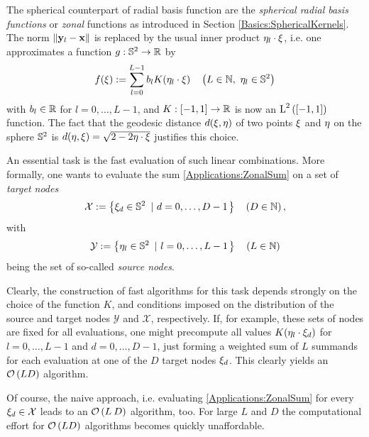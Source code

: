 The spherical counterpart of radial basis function are the \emph{spherical radial basis functions} 
or \emph{zonal} functions as introduced in Section 
\ref{Basics:SphericalKernels}. The norm $\left\|\mathbf{y}_{l}-\mathbf{x}\right\|$ is replaced 
by the usual inner product $\mathbf{\eta}_{l}\cdot\mathbf{\xi}$, i.e. one
approximates a function $g: \mathbb{S}^2 \rightarrow \mathbb{R}$ by
\begin{equation}
  \label{Applications:ZonalSum}
  f{\hspace{-0.4ex}}\left(\mathbf{\xi}\right) := \sum_{l=0}^{L-1} b_{l} K{\hspace{-0.4ex}}\left(\mathbf{\eta}_{l}\cdot\mathbf{\xi}\right) \quad 
  \left(L \in \mathbb{N},\ \mathbf{\eta}_{l} \in \mathbb{S}^2\right)
\end{equation}
with $b_{l} \in \mathbb{R}$ for $l=0,\ldots,L-1$, and 
$K: [-1,1] \rightarrow \mathbb{R}$ is now an $\text{\rm{L}}^{2}\left([-1,1]\right)$ function. 
The fact that the geodesic distance $d{\hspace{-0.4ex}}\left(\mathbf{\xi},\mathbf{\eta}\right)$ of two points 
$\mathbf{\xi}$ and $\mathbf{\eta}$ on the 
sphere $\mathbb{S}^2$ is $d{\hspace{-0.4ex}}\left(\mathbf{\eta},\mathbf{\xi}\right) = 
\sqrt{2-2\mathbf{\eta}\cdot\mathbf{\xi}}$ justifies this choice.

An essential task is the fast evaluation of such linear combinations. More formally, 
one wants to evaluate the sum \eqref{Applications:ZonalSum}
on a set of \emph{target nodes} 
$$
  \mathcal{X} := \left\{\mathbf{\xi}_{d} \in \mathbb{S}^2\ \left|\ d=0,\ldots,D-1\right.\right\rbrace \quad \left(D \in \mathbb{N}\right),
$$ 
with 
$$
  \mathcal{Y} := \left\{\mathbf{\eta}_{l} \in \mathbb{S}^2\ \left|\ l = 0,\ldots,L-1\right.\right\rbrace \quad \left(L \in \mathbb{N}\right)
$$
being the set of so-called \emph{source nodes}.

Clearly, the construction of fast algorithms for this task depends strongly on the
choice of the function $K$, and conditions imposed on the distribution of the 
source and target nodes $\mathcal{Y}$ and $\mathcal{X}$, respectively.
If, for example, these sets of nodes are fixed for all evaluations, one might 
precompute all values $ K{\hspace{-0.4ex}}\left(\mathbf{\eta}_{l}\cdot\mathbf{\xi}_{d}\right)$ for $l=0,\ldots,L-1$ and 
$d=0,\ldots,D-1$, just forming a weighted sum of $L$ summands for each evaluation 
at one of the $D$ target nodes $\mathbf{\xi}_{d}$. This clearly yields an $\mathcal{O}\left(L D\right)$ algorithm.

Of course, the naive approach, i.e. evaluating \eqref{Applications:ZonalSum} for every $\mathbf{\xi}_{d} 
\in \mathcal{X}$ leads to an $\mathcal{O}\left(L\:D\right)$ algorithm, too. 
For large $L$ and $D$ the computational effort for $\mathcal{O}\left(L D\right)$ algorithms 
becomes quickly unaffordable.

